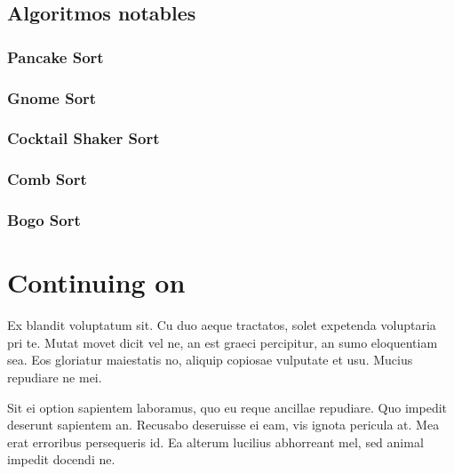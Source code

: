 \documentclass[11pt,openany]{book}
\begin{document}
\section{Algoritmos notables}
\subsection{Pancake Sort}
\subsection{Gnome Sort}
\subsection{Cocktail Shaker Sort}
\subsection{Comb Sort}
\subsection{Bogo Sort}
\printnotes*


\chapter{Continuing on}

Ex blandit voluptatum sit. Cu duo aeque tractatos, solet expetenda voluptaria pri te. Mutat movet dicit vel ne, an est graeci percipitur, an sumo eloquentiam sea. Eos gloriatur maiestatis no, aliquip copiosae vulputate et usu. Mucius repudiare ne mei.

Sit ei option sapientem laboramus, quo eu reque ancillae repudiare. Quo impedit deserunt sapientem an. Recusabo deseruisse ei eam, vis ignota pericula at. Mea erat erroribus persequeris id. Ea alterum lucilius abhorreant mel, sed animal impedit docendi ne.

\printnotes*
\end{document}
